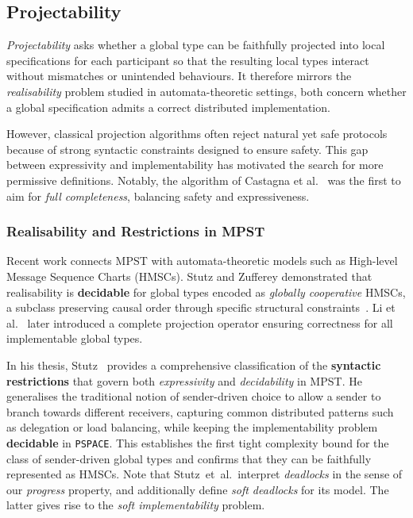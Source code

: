 \subsection{Projectability}
\emph{Projectability} asks whether a global type can be faithfully 
projected into local specifications for each participant so that the 
resulting local types interact without mismatches or unintended 
behaviours.  
It therefore mirrors the \emph{realisability} problem studied in 
automata-theoretic settings, both concern whether a global specification 
admits a correct distributed implementation.

However, classical projection algorithms often reject natural yet safe 
protocols because of strong syntactic constraints designed to ensure 
safety.  
This gap between expressivity and implementability has motivated the 
search for more permissive definitions.  
Notably, the algorithm of Castagna et al.~\cite{castagna2012global} 
was the first to aim for \emph{full completeness}, balancing safety 
and expressiveness.

\subsubsection{Realisability and Restrictions in MPST}
Recent work connects MPST with automata-theoretic models such as High-level 
Message Sequence Charts (HMSCs). Stutz and Zufferey demonstrated that 
realisability is \textbf{decidable} for global types encoded as 
\emph{globally cooperative} HMSCs, a subclass preserving causal order through 
specific structural constraints~\cite{DBLP:journals/corr/abs-2209-10328,DBLP:conf/ecoop/Stutz23}.  
Li et al.~\cite{li2023complete} later introduced a complete projection operator 
ensuring correctness for all implementable global types.  

In his thesis, Stutz~\cite{stutz2024implementability} provides a comprehensive 
classification of the \textbf{syntactic restrictions} that govern both 
\emph{expressivity} and \emph{decidability} in MPST.  
He generalises the traditional notion of sender-driven choice to allow a sender 
to branch towards different receivers, capturing common distributed patterns 
such as delegation or load balancing, while keeping the implementability 
problem \textbf{decidable} in \verb|PSPACE|.  
This establishes the first tight complexity bound for the class of 
sender-driven global types and confirms that they can be faithfully 
represented as HMSCs.  
Note that Stutz~et~al.\ interpret \emph{deadlocks} in the sense of our
\emph{progress} property, and additionally define \emph{soft deadlocks}
for its model.
The latter gives rise to the \emph{soft implementability} problem.


